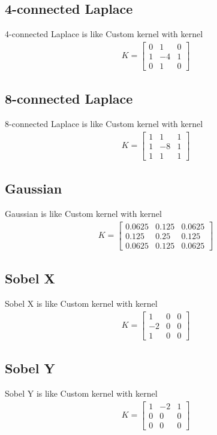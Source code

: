\documentclass{article}
\begin{document}
\subsection{4-connected Laplace}
4-connected Laplace is like Custom kernel with kernel
\begin{gather*}
    K = \begin{bmatrix} 
    0 & 1 & 0 \\ 
    1 & -4 & 1 \\ 
    0 & 1 & 0
    \end{bmatrix}
\end{gather*}
\subsection{8-connected Laplace}
8-connected Laplace is like Custom kernel with kernel
\begin{gather*}
    K = \begin{bmatrix} 
    1 & 1 & 1 \\ 
    1 & -8 & 1 \\ 
    1 & 1 & 1
    \end{bmatrix}
\end{gather*}
\subsection{Gaussian}
Gaussian is like Custom kernel with kernel
\begin{gather*}
    K = \begin{bmatrix} 
    0.0625 & 0.125 & 0.0625 \\ 
    0.125 & 0.25 & 0.125 \\ 
    0.0625 & 0.125 & 0.0625
    \end{bmatrix}
\end{gather*}
\subsection{Sobel X}
Sobel X is like Custom kernel with kernel
\begin{gather*}
    K = \begin{bmatrix} 
    1 & 0 & 0 \\ 
    -2 & 0 & 0 \\ 
    1 & 0 & 0
    \end{bmatrix}
\end{gather*}
\subsection{Sobel Y}
Sobel Y is like Custom kernel with kernel
\begin{gather*}
    K = \begin{bmatrix} 
    1 & -2 & 1 \\ 
    0 & 0 & 0 \\ 
    0 & 0 & 0
    \end{bmatrix}
\end{gather*}
\end{document}
